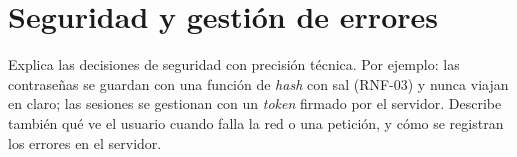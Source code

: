 \section{Seguridad y gestión de errores}
\label{sec:seguridad}

Explica las decisiones de seguridad con precisión técnica. Por ejemplo: las
contraseñas se guardan con una función de \emph{hash} con sal (RNF-03) y nunca
viajan en claro; las sesiones se gestionan con un \emph{token} firmado por el
servidor. Describe también qué ve el usuario cuando falla la red o una
petición, y cómo se registran los errores en el servidor.
